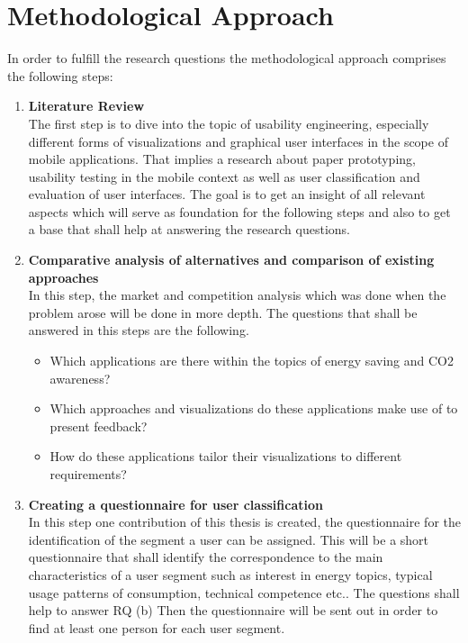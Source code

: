 \section{Methodological Approach}

In order to fulfill the research questions the methodological approach comprises the following steps:
\begin{enumerate}
	\item \textbf{Literature Review} \\
	The first step is to dive into the topic of usability engineering, especially different forms of visualizations and graphical user interfaces in the scope of mobile applications. That implies a research about paper prototyping, usability testing in the mobile context as well as user classification and evaluation of user interfaces. The goal is to get an insight of all relevant aspects which will serve as foundation for the following steps and also to get a base that shall help at answering the research questions.
	
	\item \textbf{Comparative analysis of alternatives and comparison of existing approaches} \\
	In this step, the market and competition analysis which was done when the problem arose will be done in more depth. The questions that shall be answered in this steps are the following.
	\begin{itemize}
		\item Which applications are there within the topics of energy saving and CO2 awareness?
		\item Which approaches and visualizations do these applications make use of to present feedback?
		\item How do these applications tailor their visualizations to different requirements?
	\end{itemize}


	\item \textbf{Creating a questionnaire for user classification} \\
	In this step one contribution of this thesis is created, the questionnaire for the identification of the segment a user can be assigned. This will be a short questionnaire that shall identify the correspondence to the main characteristics of a user segment such as interest in energy topics, typical usage patterns of consumption, technical competence etc.. The questions shall help to answer RQ (b) Then the questionnaire will be sent out in order to find at least one person for each user segment.
	

\end{enumerate}
